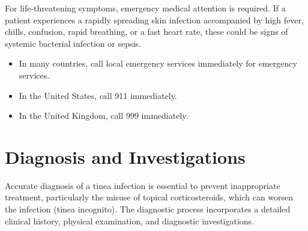 For life-threatening symptoms, emergency medical attention is required. If a patient experiences a rapidly spreading skin infection accompanied by high fever, chills, confusion, rapid breathing, or a fast heart rate, these could be signs of systemic bacterial infection or sepsis.
\begin{itemize}
    \item In many countries, call local emergency services immediately for emergency services.
    \item In the United States, call 911 immediately.
    \item In the United Kingdom, call 999 immediately.
\end{itemize}

\section*{Diagnosis and Investigations}
Accurate diagnosis of a tinea infection is essential to prevent inappropriate treatment, particularly the misuse of topical corticosteroids, which can worsen the infection (tinea incognito). The diagnostic process incorporates a detailed clinical history, physical examination, and diagnostic investigations.
